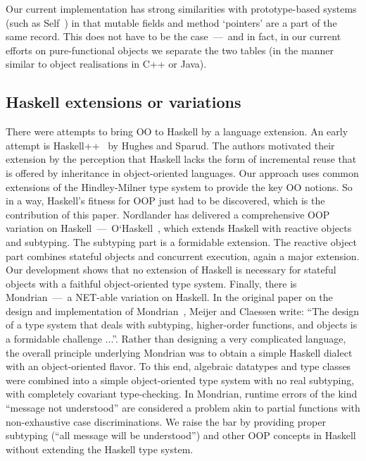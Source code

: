 Our current implementation has strong similarities with
prototype-based systems (such as Self~\cite{Self}) in that mutable
fields and method `pointers' are a part of the same record. This does
not have to be the case~---~and in fact, in our current efforts on
pure-functional objects we separate the two tables (in the manner
similar to object realisations in C++ or Java).



\subsection{Haskell extensions or variations}

There were attempts to bring OO to Haskell by a language extension. An
early attempt is Haskell++~\cite{HS95} by Hughes and Sparud. The
authors motivated their extension by the perception that Haskell lacks
the form of incremental reuse that is offered by inheritance in
object-oriented languages. Our approach uses common extensions of the
Hindley-Milner type system to provide the key OO notions.  So in a
way, Haskell's fitness for OOP just had to be discovered, which is the
contribution of this paper. Nordlander has delivered a comprehensive
OOP variation on
Haskell~---~O`Haskell~\cite{Nordlander98,Nordlander02}, which extends
Haskell with reactive objects and subtyping. The subtyping part is a
formidable extension. The reactive object part combines stateful
objects and concurrent execution, again a major extension. Our
development shows that no extension of Haskell is necessary for
stateful objects with a faithful object-oriented type system. Finally,
there is Mondrian~---~a NET-able variation on Haskell. In the original
paper on the design and implementation of Mondrian~\cite{MC97}, Meijer
and Claessen write: ``The design of a type system that deals with
subtyping, higher-order functions, and objects is a formidable
challenge ...''. Rather than designing a very complicated language,
the overall principle underlying Mondrian was to obtain a simple
Haskell dialect with an object-oriented flavor. To this end, algebraic
datatypes and type classes were combined into a simple object-oriented
type system with no real subtyping, with completely covariant
type-checking. In Mondrian, runtime errors of the kind ``message not
understood'' are considered a problem akin to partial functions with
non-exhaustive case discriminations. We raise the bar by providing
proper subtyping (``all message will be understood'') and other OOP
concepts in Haskell without extending the Haskell type system.



